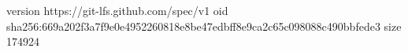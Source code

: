 version https://git-lfs.github.com/spec/v1
oid sha256:669a202f3a7f9e0e4952260818e8be47edbff8e9ca2c65c098088c490bbfede3
size 174924
